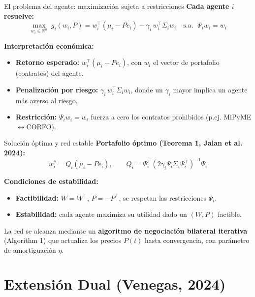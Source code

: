 \documentclass[aspectratio=169]{beamer}
\begin{document}
\begin{frame}{El problema del agente: maximización sujeta a restricciones}
\textbf{Cada agente $i$ resuelve:}
\begin{equation}
\boxed{\max_{w_i \in \mathbb{R}^n} \; g_i(w_i,P) = w_i^\top(\mu_i - Pe_i) - \gamma_i\, w_i^\top \Sigma_i w_i \quad \text{s.a. } \; \Psi_i w_i = w_i}
\end{equation}

\vspace{0.2cm}
\textbf{Interpretación económica:}
\begin{itemize}
    \item \textbf{Retorno esperado:} $w_i^\top(\mu_i - Pe_i)$, con $w_i$ el vector de portafolio (contratos) del agente.
    \item \textbf{Penalización por riesgo:} $\gamma_i\, w_i^\top \Sigma_i w_i$, donde un $\gamma_i$ mayor implica un agente más averso al riesgo.
    \item \textbf{Restricción:} $\Psi_i w_i = w_i$ fuerza a cero los contratos prohibidos (p.ej. MiPyME$\leftrightarrow$CORFO).
\end{itemize}
\end{frame}

\begin{frame}{Solución óptima y red estable}
\textbf{Portafolio óptimo (Teorema 1, Jalan et al. 2024):}
$$w_i^* = Q_i(\mu_i - Pe_i), \qquad Q_i = \Psi_i^\top\left(2\gamma_i \Psi_i \Sigma_i \Psi_i^\top\right)^{-1}\Psi_i$$

\vspace{0.3cm}
\textbf{Condiciones de estabilidad:}
\begin{itemize}
    \item \textbf{Factibilidad:} $W=W^\top$, $P=-P^\top$, se respetan las restricciones $\Psi_i$.
    \item \textbf{Estabilidad:} cada agente maximiza su utilidad dado un $(W,P)$ factible.
\end{itemize}

\vspace{0.3cm}
La red se alcanza mediante un \textbf{algoritmo de negociación bilateral iterativa} (Algorithm 1) que actualiza los precios $P(t)$ hasta convergencia, con parámetro de amortiguación $\eta$.
\end{frame}

\section{Extensión Dual (Venegas, 2024)}
\end{document}
